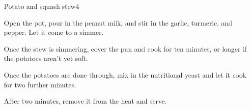 \documentclass{article}
\begin{document}
\begin{recipe}{Potato and squash stew}{4}
\begin{step}
\begin{stepdesc}
      \end{stepdesc}
    \end{step}
    \begin{step}
      \begin{ingrs}
      \end{ingrs}
      \begin{stepdesc}
        Open the pot, pour in the peanut milk, and stir in the garlic, turmeric, and pepper. Let it come to a simmer.
      \end{stepdesc}
    \end{step}
    \begin{step}
      \begin{ingrs}
      \end{ingrs}
      \begin{stepdesc}
        Once the stew is simmering, cover the pan and cook for ten minutes, or longer if the potatoes aren't yet soft.
      \end{stepdesc}
    \end{step}
    \begin{step}
      \begin{ingrs}
      \end{ingrs}
      \begin{stepdesc}
        Once the potatoes are done through, mix in the nutritional yeast and let it cook for two further minutes.
      \end{stepdesc}
    \end{step}
    \begin{step}
      \begin{ingrs}
      \end{ingrs}
      \begin{stepdesc}
        After two minutes, remove it from the heat and serve.
      \end{stepdesc}
    \end{step}
  \end{recipe}
\end{document}
